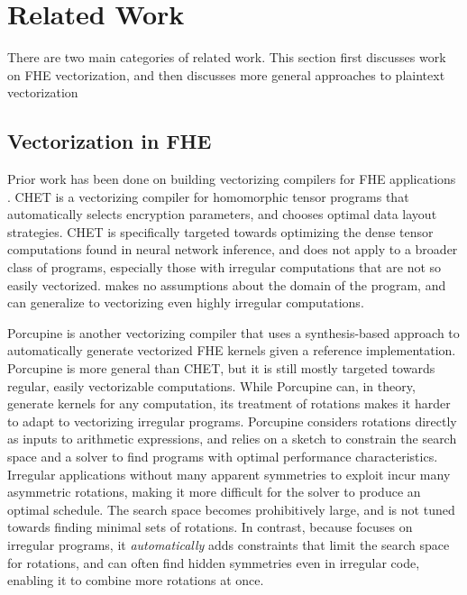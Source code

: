 \section{Related Work}\label{sec:related-work}
There are two main categories of related work. This section first discusses work on FHE vectorization, and then discusses more general approaches to plaintext vectorization 

\subsection{Vectorization in FHE}
Prior work has been done on building vectorizing compilers for FHE applications \cite{CHET, Porcupine}.
CHET \cite{CHET} is a vectorizing compiler for homomorphic tensor programs that automatically selects encryption parameters, and chooses optimal data layout strategies.
CHET is specifically targeted towards optimizing the dense tensor computations found in neural network inference, and does not apply to a broader class of programs, especially those with irregular computations that are not so easily vectorized.
\system makes no assumptions about the domain of the program, and can generalize to vectorizing even highly irregular computations.

Porcupine \cite{Porcupine} is another vectorizing compiler that uses a synthesis-based approach to automatically generate vectorized FHE kernels given a reference implementation.
Porcupine is more general than CHET, but it is still mostly targeted towards regular, easily vectorizable computations.
While Porcupine can, in theory, generate kernels for any computation, its treatment of rotations makes it harder to adapt to vectorizing irregular programs.
Porcupine considers rotations directly as inputs to arithmetic expressions, and relies on a sketch to constrain the search space and a solver to find programs with optimal performance characteristics.
Irregular applications without many apparent symmetries to exploit incur many asymmetric rotations, making it more difficult for the solver to produce an optimal schedule. The search space becomes prohibitively large, and is not tuned towards finding minimal sets of rotations.
In contrast, because \system focuses on irregular programs, it {\em automatically} adds constraints that limit the search space for rotations, and can often find hidden symmetries even in irregular code, enabling it to combine more rotations at once. 

